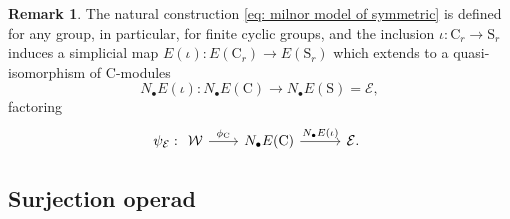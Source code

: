 \documentclass[A4]{amsart}
\theoremstyle{definition}
\newtheorem{remark}[theorem]{Remark}
\begin{document}
\begin{table}[h]
	\centering
	\vspace*{3pt}
	\caption{The elements $\psi_{\mathcal E}(r)(e_n)$ for small values of $r$ and $n$ where we are denoting $(\rho^{r_0}, \dots, \rho^{r_n})$ simply by $(r_0, \dots, r_n)$.}
	\label{fig: Barratt-Eccles Steenrod products}
\end{table}

\begin{remark}
	The natural construction \eqref{eq: milnor model of symmetric} is defined for any group, in particular, for finite cyclic groups, and the inclusion $\iota : \mathrm C_r \to \mathrm S_r$ induces a simplicial map $E(\iota) \colon E(\mathrm C_r) \to E(\mathrm S_r)$ which extends to a quasi-isomorphism of $\mathrm C$-modules
	\begin{equation*}
	N_\bullet E(\iota) : N_\bullet E(\mathrm C) \to N_\bullet E(\mathrm S) = \mathcal E,
	\end{equation*}
	factoring
	\begin{equation*}
	\psi_{\mathcal E} :
	\begin{tikzcd}
	\mathcal W \arrow[r, "\phi_{\mathrm C}"] &[-3pt] N_\bullet E(\mathrm C) \arrow[r, "N_\bullet E(\iota)"] &[5pt] \mathcal E.
	\end{tikzcd}
	\end{equation*}
\end{remark}

\subsection{Surjection operad}
\end{document}
